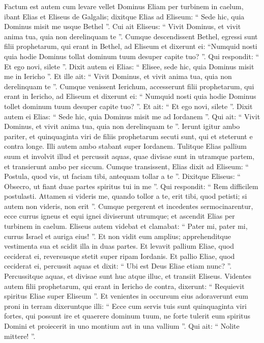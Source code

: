 \begin{biblechapter}
\begin{biblechapter}
 \verse Factum est autem cum levare vellet Dominus Eliam per turbinem in caelum, ibant Elias et Eliseus de Galgalis; 
\verse dixitque Elias ad Eliseum: “ Sede hic, quia Dominus misit me usque Bethel ”. Cui ait Eliseus: “ Vivit Dominus, et vivit anima tua, quia non derelinquam te ”. Cumque descendissent Bethel, 
\verse egressi sunt filii prophetarum, qui erant in Bethel, ad Eliseum et dixerunt ei: “Numquid nosti quia hodie Dominus tollat dominum tuum desuper capite tuo? ”. Qui respondit: “ Et ego novi, silete ”. 
\verse Dixit autem ei Elias: “ Elisee, sede hic, quia Dominus misit me in Iericho ”. Et ille ait: “ Vivit Dominus, et vivit anima tua, quia non derelinquam te ”. Cumque venissent Ierichum, 
\verse accesserunt filii prophetarum, qui erant in Iericho, ad Eliseum et dixerunt ei: “ Numquid nosti quia hodie Dominus tollet dominum tuum desuper capite tuo? ”. Et ait: “ Et ego novi, silete ”. 
\verse Dixit autem ei Elias: “ Sede hic, quia Dominus misit me ad Iordanem ”. Qui ait: “ Vivit Dominus, et vivit anima tua, quia non derelinquam te ”. Ierunt igitur ambo pariter, 
\verse et quinquaginta viri de filiis prophetarum secuti sunt, qui et steterunt e contra longe. Illi autem ambo stabant super Iordanem. 
\verse Tulitque Elias pallium suum et involvit illud et percussit aquas, quae divisae sunt in utramque partem, et transierunt ambo per siccum.
 \verse Cumque transissent, Elias dixit ad Eliseum: “ Postula, quod vis, ut faciam tibi, antequam tollar a te ”. Dixitque Eliseus: “ Obsecro, ut fiant duae partes spiritus tui in me ”. 
\verse Qui respondit: “ Rem difficilem postulasti. Attamen si videris me, quando tollor a te, erit tibi, quod petisti; si autem non videris, non erit ”. 
\verse Cumque pergerent et incedentes sermocinarentur, ecce currus igneus et equi ignei diviserunt utrumque; et ascendit Elias per turbinem in caelum.
 \verse Eliseus autem videbat et clamabat: “ Pater mi, pater mi, currus Israel et auriga eius! ”. Et non vidit eum amplius; apprehenditque vestimenta sua et scidit illa in duas partes. 
\verse Et levavit pallium Eliae, quod ceciderat ei, reversusque stetit super ripam Iordanis. 
\verse Et pallio Eliae, quod ceciderat ei, percussit aquas et dixit: “ Ubi est Deus Eliae etiam nunc? ”. Percussitque aquas, et divisae sunt huc atque illuc, et transiit Eliseus.
 \verse Videntes autem filii prophetarum, qui erant in Iericho de contra, dixerunt: “ Requievit spiritus Eliae super Eliseum ”. Et venientes in occursum eius adoraverunt eum proni in terram 
\verse dixeruntque illi: “ Ecce cum servis tuis sunt quinquaginta viri fortes, qui possunt ire et quaerere dominum tuum, ne forte tulerit eum spiritus Domini et proiecerit in uno montium aut in una vallium ”. Qui ait: “ Nolite mittere! ”. 

\end{biblechapter}
\end{biblechapter}
